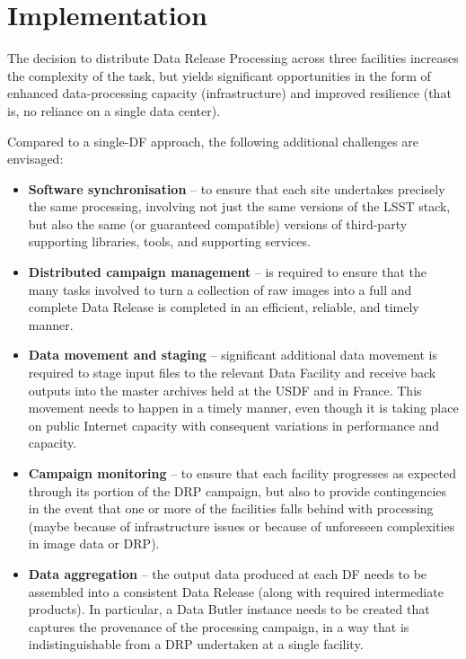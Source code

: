 \section{Implementation}\label{sec:timeline}


The decision to distribute Data Release Processing across three facilities increases the complexity of the task, but yields significant opportunities in the form of enhanced data-processing capacity (infrastructure) and improved resilience (that is, no reliance on a single data center).

Compared to a single-DF approach, the following additional challenges are envisaged:

\begin{itemize}

\item {\bf Software synchronisation} -- to ensure that each site undertakes precisely the same processing, involving not just the same versions of the LSST stack, but also the same (or guaranteed compatible) versions of third-party supporting libraries, tools, and supporting services.

\item {\bf Distributed campaign management} -- is required to ensure that the many tasks involved to turn a collection of raw images into a full and complete Data Release is completed in an efficient, reliable, and timely manner.

\item {\bf Data movement and staging} -- significant additional data movement is required to stage input files to the relevant Data Facility and receive back outputs into the master archives held at the USDF and in France. This movement needs to happen in a timely manner, even though it is taking place on public Internet capacity with consequent variations in performance and capacity.

\item {\bf Campaign monitoring} -- to ensure that each facility progresses as expected through its portion of the DRP campaign, but also to provide contingencies in the event that one or more of the facilities falls behind with processing (maybe because of infrastructure issues or because of unforeseen complexities in image data or DRP).
  
\item {\bf Data aggregation} -- the output data produced at each DF needs to be assembled into a consistent Data Release (along with required intermediate products). In particular, a Data Butler instance needs to be created that captures the provenance of the processing campaign, in a way that is indistinguishable from a DRP undertaken at a single facility.
  

\end{itemize}
